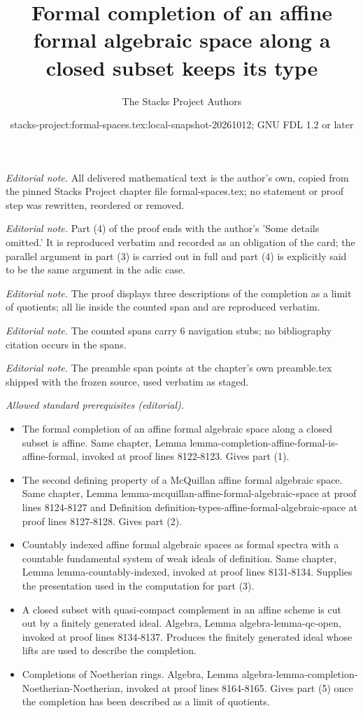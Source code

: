 \documentclass{stacks-project}
\title{Formal completion of an affine formal algebraic space along a closed subset keeps its type}
\author{The Stacks Project Authors}
\date{stacks-project:formal-spaces.tex:local-snapshot-20261012; GNU FDL 1.2 or later}
\theoremstyle{plain}
\theoremstyle{definition}
\theoremstyle{remark}
\numberwithin{equation}{subsection}
\begin{document}
\maketitle
\noindent\textit{Editorial note.} All delivered mathematical text is the author's own, copied from the pinned Stacks Project chapter file formal-spaces.tex; no statement or proof step was rewritten, reordered or removed.\par\medskip
\noindent\textit{Editorial note.} Part (4) of the proof ends with the author's 'Some details omitted.' It is reproduced verbatim and recorded as an obligation of the card; the parallel argument in part (3) is carried out in full and part (4) is explicitly said to be the same argument in the adic case.\par\medskip
\noindent\textit{Editorial note.} The proof displays three descriptions of the completion as a limit of quotients; all lie inside the counted span and are reproduced verbatim.\par\medskip
\noindent\textit{Editorial note.} The counted spans carry 6 navigation stubs; no bibliography citation occurs in the spans.\par\medskip
\noindent\textit{Editorial note.} The preamble span points at the chapter's own preamble.tex shipped with the frozen source, used verbatim as staged.\par\medskip
\noindent\textit{Allowed standard prerequisites (editorial).}\begin{itemize}
\item The formal completion of an affine formal algebraic space along a closed subset is affine. Same chapter, Lemma lemma-completion-affine-formal-is-affine-formal, invoked at proof lines 8122-8123. Gives part (1).
\item The second defining property of a McQuillan affine formal algebraic space. Same chapter, Lemma lemma-mcquillan-affine-formal-algebraic-space at proof lines 8124-8127 and Definition definition-types-affine-formal-algebraic-space at proof lines 8127-8128. Gives part (2).
\item Countably indexed affine formal algebraic spaces as formal spectra with a countable fundamental system of weak ideals of definition. Same chapter, Lemma lemma-countably-indexed, invoked at proof lines 8131-8134. Supplies the presentation used in the computation for part (3).
\item A closed subset with quasi-compact complement in an affine scheme is cut out by a finitely generated ideal. Algebra, Lemma algebra-lemma-qc-open, invoked at proof lines 8134-8137. Produces the finitely generated ideal whose lifts are used to describe the completion.
\item Completions of Noetherian rings. Algebra, Lemma algebra-lemma-completion-Noetherian-Noetherian, invoked at proof lines 8164-8165. Gives part (5) once the completion has been described as a limit of quotients.
\end{itemize}\medskip
\end{document}

